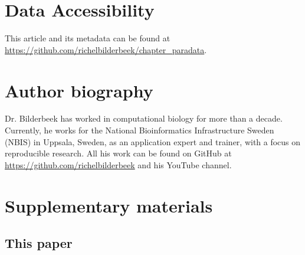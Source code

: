 \section{Data Accessibility}

This article and its metadata can be found at 
\url{https://github.com/richelbilderbeek/chapter_paradata}.

\section{Author biography}

Dr. Bilderbeek has worked in computational biology for more than a decade.
Currently, he works for the National Bioinformatics Infrastructure Sweden (NBIS)
in Uppsala, Sweden, 
as an application expert and trainer, with a focus on reproducible research.
All his work can be found on GitHub at \url{https://github.com/richelbilderbeek}
and his YouTube channel.




\iffalse

\newpage
\appendix
\section{Supplementary materials}

\renewcommand{\thefigure}{S\arabic{figure}}
\setcounter{figure}{0}

\renewcommand{\thetable}{S\arabic{table}}
\setcounter{table}{0}

\subsection{This paper}

